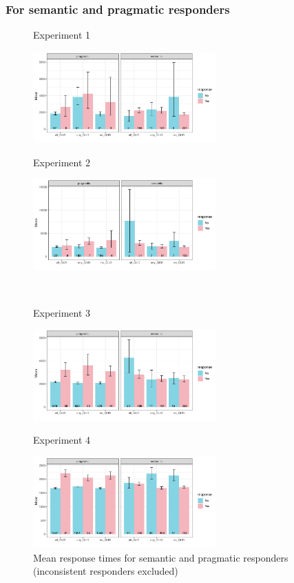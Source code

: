 \documentclass[12pt]{article}
\begin{document}
\pagebreak
\subsubsection*{For semantic and pragmatic responders}
\begin{figure}[!h] 
    \centering
    \begin{minipage}{.5\textwidth}
        \caption*{Experiment 1}
        \includegraphics[height=3.5cm]{img/exp1_responder.pdf}
    \end{minipage}%
    \begin{minipage}{.5\textwidth}
        \caption*{Experiment 2}
        \includegraphics[height=3.5cm]{img/exp2_responder.pdf}
    \end{minipage}%
    \\
    \begin{minipage}{.5\textwidth}
        \caption*{Experiment 3}
        \includegraphics[height=3.5cm]{img/exp3_responder.pdf}
    \end{minipage}%
    \begin{minipage}{.5\textwidth}
        \caption*{Experiment 4}
        \includegraphics[height=3.5cm]{img/exp4_responder.pdf}
    \end{minipage}%
    \caption{Mean response times for semantic and pragmatic responders (inconsistent responders excluded)}
\end{figure}
\end{document}

